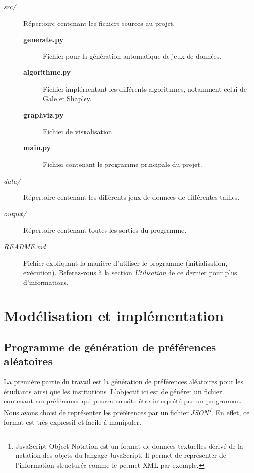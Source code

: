 \documentclass[12pt,titlepage]{article}
\begin{document}
\begin{description}

\item[\textit{src/}] Répertoire contenant les fichiers sources du projet.

\begin{description}

\item[\textbf{generate.py}] Fichier pour la génération automatique de jeux de données.

\item[\textbf{algorithme.py}] Fichier implémentant les différents algorithmes, notamment celui de Gale et Shapley.

\item[\textbf{graphviz.py}] Fichier de visualisation.

\item[\textbf{main.py}] Fichier contenant le programme principale du projet.

\end{description}

\item[\textit{data/}] Répertoire contenant les différents jeux de données de différentes tailles.

\item[\textit{output/}] Répertoire contenant toutes les sorties du programme.

\item[\textit{README.md}] Fichier expliquant la manière d'utiliser le programme (initialisation, exécution). Referez-vous à la section \textit{Utilisation} de ce dernier pour plus d'informations.

\end{description}



\section{Modélisation et implémentation}


\subsection{Programme de génération de préférences aléatoires}


La première partie du travail est la génération de préférences aléatoires pour les étudiants ainsi que les institutions. L'objectif ici est de générer un fichier contenant ces préférences qui pourra ensuite être interprété par un programme. Nous avons choisi de représenter les préférences par un fichier \textit{JSON\footnote{JavaScript Object Notation est un format de données textuelles dérivé de la notation des objets du langage JavaScript. Il permet de représenter de l’information structurée comme le permet XML par exemple.}}. En effet, ce format est très expressif et facile à manipuler.
\end{document}

